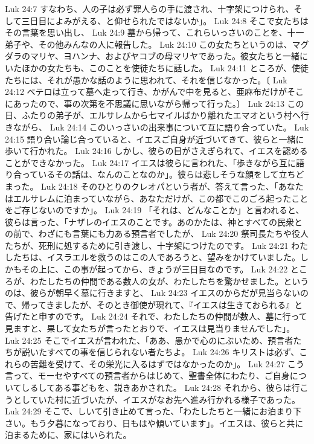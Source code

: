 Luk 24:7  すなわち、人の子は必ず罪人らの手に渡され、十字架につけられ、そして三日目によみがえる、と仰せられたではないか」。
Luk 24:8  そこで女たちはその言葉を思い出し、
Luk 24:9  墓から帰って、これらいっさいのことを、十一弟子や、その他みんなの人に報告した。
Luk 24:10  この女たちというのは、マグダラのマリヤ、ヨハンナ、およびヤコブの母マリヤであった。彼女たちと一緒にいたほかの女たちも、このことを使徒たちに話した。
Luk 24:11  ところが、使徒たちには、それが愚かな話のように思われて、それを信じなかった。〔
Luk 24:12  ペテロは立って墓へ走って行き、かがんで中を見ると、亜麻布だけがそこにあったので、事の次第を不思議に思いながら帰って行った。〕
Luk 24:13  この日、ふたりの弟子が、エルサレムから七マイルばかり離れたエマオという村へ行きながら、
Luk 24:14  このいっさいの出来事について互に語り合っていた。
Luk 24:15  語り合い論じ合っていると、イエスご自身が近づいてきて、彼らと一緒に歩いて行かれた。
Luk 24:16  しかし、彼らの目がさえぎられて、イエスを認めることができなかった。
Luk 24:17  イエスは彼らに言われた、「歩きながら互に語り合っているその話は、なんのことなのか」。彼らは悲しそうな顔をして立ちどまった。
Luk 24:18  そのひとりのクレオパという者が、答えて言った、「あなたはエルサレムに泊まっていながら、あなただけが、この都でこのごろ起ったことをご存じないのですか」。
Luk 24:19  「それは、どんなことか」と言われると、彼らは言った、「ナザレのイエスのことです。あのかたは、神とすべての民衆との前で、わざにも言葉にも力ある預言者でしたが、
Luk 24:20  祭司長たちや役人たちが、死刑に処するために引き渡し、十字架につけたのです。
Luk 24:21  わたしたちは、イスラエルを救うのはこの人であろうと、望みをかけていました。しかもその上に、この事が起ってから、きょうが三日目なのです。
Luk 24:22  ところが、わたしたちの仲間である数人の女が、わたしたちを驚かせました。というのは、彼らが朝早く墓に行きますと、
Luk 24:23  イエスのからだが見当らないので、帰ってきましたが、そのとき御使が現れて、『イエスは生きておられる』と告げたと申すのです。
Luk 24:24  それで、わたしたちの仲間が数人、墓に行って見ますと、果して女たちが言ったとおりで、イエスは見当りませんでした」。
Luk 24:25  そこでイエスが言われた、「ああ、愚かで心のにぶいため、預言者たちが説いたすべての事を信じられない者たちよ。
Luk 24:26  キリストは必ず、これらの苦難を受けて、その栄光に入るはずではなかったのか」。
Luk 24:27  こう言って、モーセやすべての預言者からはじめて、聖書全体にわたり、ご自身についてしるしてある事どもを、説きあかされた。
Luk 24:28  それから、彼らは行こうとしていた村に近づいたが、イエスがなお先へ進み行かれる様子であった。
Luk 24:29  そこで、しいて引き止めて言った、「わたしたちと一緒にお泊まり下さい。もう夕暮になっており、日もはや傾いています」。イエスは、彼らと共に泊まるために、家にはいられた。
